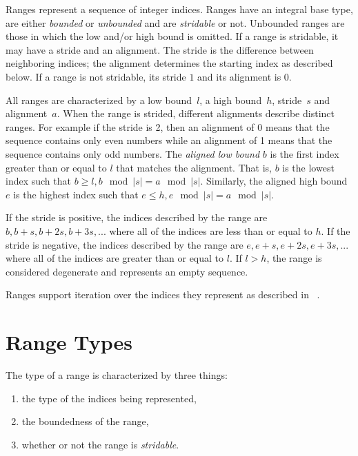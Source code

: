 \label{Ranges}

Ranges represent a sequence of integer indices.  Ranges have an integral base
type, are either \emph{bounded} or \emph{unbounded} and are \emph{stridable} or not.
Unbounded ranges are those in which the low and/or high bound is
omitted.  
If a range is stridable, it may have a stride and an
alignment.  The stride is the difference between neighboring indices; the
alignment determines the starting index as described below.  If a range is not
stridable, its stride $1$ and its alignment is $0$.

All ranges are characterized by a low bound~$l$, a high bound~$h$, stride~$s$
and alignment~$a$.  When the range is strided, different alignments describe
distinct ranges.  For example if the stride is 2, then an alignment of 0 means
that the sequence contains only even numbers while an alignment of 1 means that the
sequence contains only odd numbers.  The \emph{aligned low bound} $b$ is the first
index greater than or equal to $l$ that matches the alignment.  That
is, $b$ is the lowest index such that $b \geq l, b\!\mod |s| = a\!\mod |s|$.  Similarly,
the aligned high bound $e$ is the highest index such that $e \leq h, e\!\mod |s| =
a\!\mod |s|$.

If the stride is positive, the indices
described by the range are $b, b+s, b+2s, b+3s, ...$ where all of the
indices are less than or equal to $h$.  If the stride is negative, the indices
described by the range are $e, e+s, e+2s, e+3s, ...$ where all of the
indices are greater than or equal to $l$.  
If $l > h$, the range is considered
degenerate and represents an empty sequence. 

Ranges support iteration over the
indices they represent as described in ~.


\section{Range Types}
\label{Range_Types}

The type of a range is characterized by three things:
\begin{enumerate}
\item the type of the indices being represented, 
\item the boundedness of the range,
\item whether or not the range is \emph{stridable}.
\end{enumerate}

